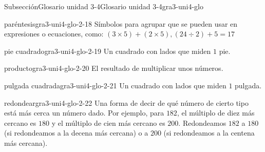 \begin{subsectionptx}{Subsección}{Glosario unidad 3-4}{}{Glosario unidad 3-4}{}{}{gra3-uni4-glo}
\begin{descriptionlist}
\begin{dlimedium}{paréntesis}{gra3-uni4-glo-2-18}
Símbolos para agrupar que se pueden usar en expresiones o ecuaciones, como: \((3 \times 5) + (2 \times 5), (24 \div 2) + 5 = 17\)%
\end{dlimedium}%
\begin{dlimedium}{pie cuadrado}{gra3-uni4-glo-2-19}%
Un cuadrado con lados que miden \(1\) pie.%
\end{dlimedium}%
\begin{dlimedium}{producto}{gra3-uni4-glo-2-20}%
El resultado de multiplicar unos números.%
\end{dlimedium}%
\begin{dlimedium}{pulgada cuadrada}{gra3-uni4-glo-2-21}%
Un cuadrado con lados que miden \(1\) pulgada.%
\end{dlimedium}%
\begin{dlimedium}{redondear}{gra3-uni4-glo-2-22}%
Una forma de decir de qué número de cierto tipo está más cerca un número dado. Por ejemplo, para \(182\), el múltiplo de diez más cercano es \(180\) y el múltiplo de cien más cercano es \(200\). Redondeamos \(182\) a \(180\) (si redondeamos a la decena más cercana) o a \(200\) (si redondeamos a la centena más cercana).%
\end{dlimedium}%
\end{descriptionlist}
\end{subsectionptx}
%
%
\typeout{************************************************}
\typeout{************************************************}
%
